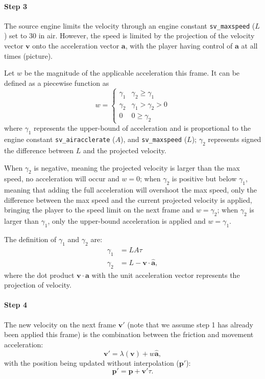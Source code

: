 \documentclass[a4paper,11pt]{article}
\newcommand{\tvec}[1]{\boldsymbol{#1}}
\newcommand{\tunit}[1]{\boldsymbol{\hat{#1}}}
\newcommand{\ta}{\tvec{a}}
\newcommand{\tv}{\tvec{v}}
\newcommand{\tp}{\tvec{p}}
\begin{document}
\paragraph{Step 3} The source engine limits the velocity through an engine constant \verb|sv_maxspeed| ($L$) set to $30$ in air. However, the speed is limited by the projection of the velocity vector $\tv$ onto the acceleration vector $\ta$, with the player having control of $\ta$ at all times (picture).

Let $w$ be the magnitude of the applicable acceleration this frame. It can be defined as a piecewise function as
\[
    w = \begin{cases}
        \gamma_1 & \gamma_2 \ge \gamma_1\\
        \gamma_2 & \gamma_1 > \gamma_2 > 0\\
        0 & 0 \ge \gamma_2
    \end{cases}
\]
where $\gamma_1$ represents the upper-bound of acceleration and is proportional to the engine constant \verb|sv_airacclerate| ($A$), and \verb|sv_maxspeed| ($L$); $\gamma_2$ represents signed the difference between $L$ and the projected velocity.

When $\gamma_2$ is negative, meaning the projected velocity is larger than the max speed, no acceleration will occur and $w=0$; when $\gamma_2$ is positive but below $\gamma_1$, meaning that adding the full acceleration will overshoot the max speed, only the difference between the max speed and the current projected velocity is applied, bringing the player to the speed limit on the next frame and $w=\gamma_2$; when $\gamma_2$ is larger than $\gamma_1$, only the upper-bound acceleration is applied and $w=\gamma_1$.

The definition of $\gamma_1$ and $\gamma_2$ are:
\begin{align*}
    \gamma_1 &= LA\tau\\
    \gamma_2 &= L - \tv \cdot \tunit{\ta},
\end{align*}
where the dot product $\tv \cdot \tunit{\ta}$ with the unit acceleration vector represents the projection of velocity.

\paragraph{Step 4} The new velocity on the next frame $\tv'$ (note that we assume step 1 has already been applied this frame) is the combination between the friction and movement acceleration:
\[
    \tv' = \lambda(\tv) + w \tunit{\ta},
\]
with the position being updated without interpolation ($\tp'$):
\[
    \tp' = \tp + \tv' \tau.
\]
\end{document}
